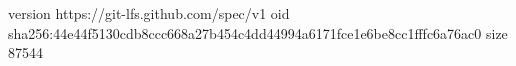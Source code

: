 version https://git-lfs.github.com/spec/v1
oid sha256:44e44f5130cdb8ccc668a27b454c4dd44994a6171fce1e6be8cc1fffc6a76ac0
size 87544

